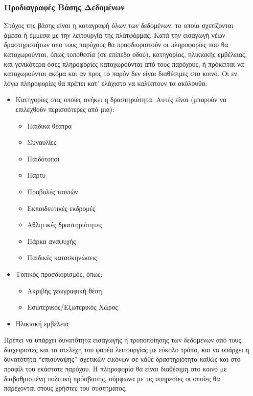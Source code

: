 \documentclass[letterpaper,6pt]{article}
\begin{document}
\subsubsection{Προδιαγραφές Βάσης Δεδομένων}
Στόχος της βάσης είναι η καταγραφή όλων των δεδομένων, τα οποία σχετίζονται άμεσα ή έμμεσα με την λειτουργία της πλατφόρμας.
Κατά την εισαγωγή νέων δραστηριοτήτων απο τους παρόχους θα προσδιοριστούν οι πληροφορίες που θα καταχωρούνται, όπως τοποθεσία (σε επίπεδο οδού), κατηγορίας, ηλικιακής εμβέλειας, και γενικότερα όσες πληροφορίες καταχωρούνται από τους παρόχους, ή πρόκειται να καταχωρούνται ακόμα και αν προς το παρόν δεν είναι διαθέσιμες στο κοινό. Οι εν λόγω πληροφορίες θα πρέπει κατ’ ελάχιστο να καλύπτουν τα ακόλουθα:
\begin{itemize}
  \item Κατηγορίες στις οποίες ανήκει η δραστηριότητα. Αυτές είναι (μπορούν να επιλεχθούν περισσότερες από μια):
    \begin{itemize}
      \item Παιδικά θέατρα
			   \item Συναυλίες
			   \item Παιδότοποι
			   \item Πάρτυ
			   \item Προβολές ταινιών
			   \item Εκπαιδευτικές εκδρομές
			   \item Αθλητικές δραστηριότητες
			   \item Πάρκα αναψυχής
			   \item Παιδικές κατασκηνώσεις
    \end{itemize}
    \item Τοπικός προσδιορισμός, όπως:
      \begin{itemize}
        \item Ακριβής γεωγραφική θέση
        \item Εσωτερικός/Εξωτερικός Χώρος
      \end{itemize}
    \item Ηλικιακή εμβέλεια
\end{itemize}
	 Πρέπει να υπάρχει δυνατότητα εισαγωγής ή τροποποίησης των δεδομένων από τους διαχειριστές και τα στελέχη του φορέα λειτουργίας με εύκολο τρόπο, και να υπάρχει η δυνατότητα “επισύναψης” σχετικών εικόνων σε κάθε δραστηριότητα καθώς και στο προφίλ του εκάστοτε παρόχου. Η πληροφορία θα είναι διαθέσιμη στο κοινό με διαβαθμισμένη πολιτική πρόσβασης, σύμφωνα με τις υπηρεσίες οι οποίες θα παρέχονται στους χρήστες του συστήματος.
\end{document}

